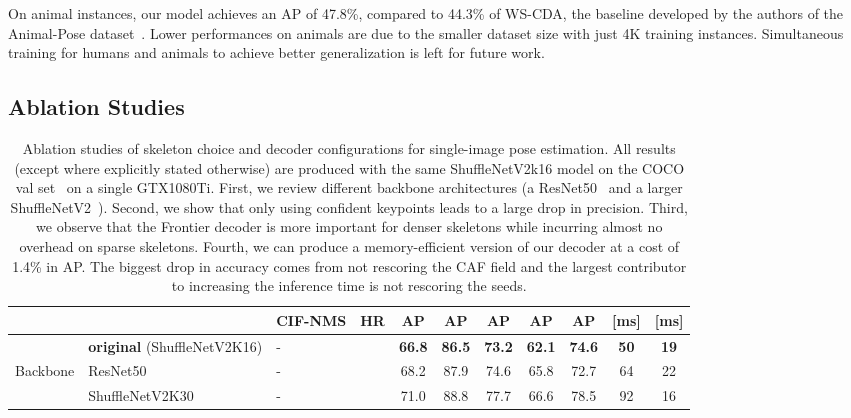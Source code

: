 \documentclass[journal]{IEEEtran}
\newcommand{\hl}[1]{#1}
\begin{document}
On animal instances, our model achieves an AP of 47.8\%, compared to 44.3\% of
WS-CDA, the baseline developed by the authors of the Animal-Pose
dataset~\cite{cao2019cross}.  Lower performances on animals are due to the
smaller dataset size with just 4K training instances. Simultaneous training for
humans and animals to achieve better generalization is left for future work.





\subsection{Ablation Studies}

\begin{table*}
  \centering
  \caption{
    Ablation studies of skeleton choice and decoder configurations for single-image pose estimation.
    All results (except where explicitly stated otherwise) are produced with the same ShuffleNetV2k16
    model on the COCO val set~\cite{lin2014microsoft} on a single GTX1080Ti.
    First, we review different backbone architectures (a ResNet50~\cite{he2016deep}
    and a larger ShuffleNetV2~\cite{ma2018shufflenet}).
    Second, we show that only using confident keypoints leads to a large
    drop in precision.
    Third, we observe that the Frontier decoder is more important for denser skeletons while incurring almost no overhead on sparse skeletons.
    Fourth, we can produce a memory-efficient version of our decoder at a cost of 1.4\% in AP. The biggest drop in accuracy comes from not rescoring the CAF field and the largest contributor to increasing the inference time is not rescoring the seeds.
  }
  \label{tab:single-image-ablation}
  \begin{tabular}{|l l|H H c c c c c c c|}
    \hline
    & & CIF-NMS & HR & AP & \hl{AP} & \hl{AP} & AP & AP &  [ms] &  [ms] \\
    \hline\hline

    & \textbf{original} (ShuffleNetV2K16)
    & - &  & \hl{\textbf{66.8}} & \hl{\textbf{86.5}} & \hl{\textbf{73.2}} & \hl{\textbf{62.1}} & \hl{\textbf{74.6}} & \hl{\textbf{50}} & \hl{\textbf{19}} \\


    \hline

    Backbone & ResNet50
    & - &       & \hl{68.2} & \hl{87.9} & \hl{74.6} & \hl{65.8}     & \hl{72.7}     & \hl{64}   & \hl{22} \\
    & ShuffleNetV2K30
    & - &       & \hl{71.0} & \hl{88.8} & \hl{77.7} & \hl{66.6}     & \hl{78.5}     & \hl{92}   & \hl{16} \\


\end{tabular}
\end{table*}
\end{document}
